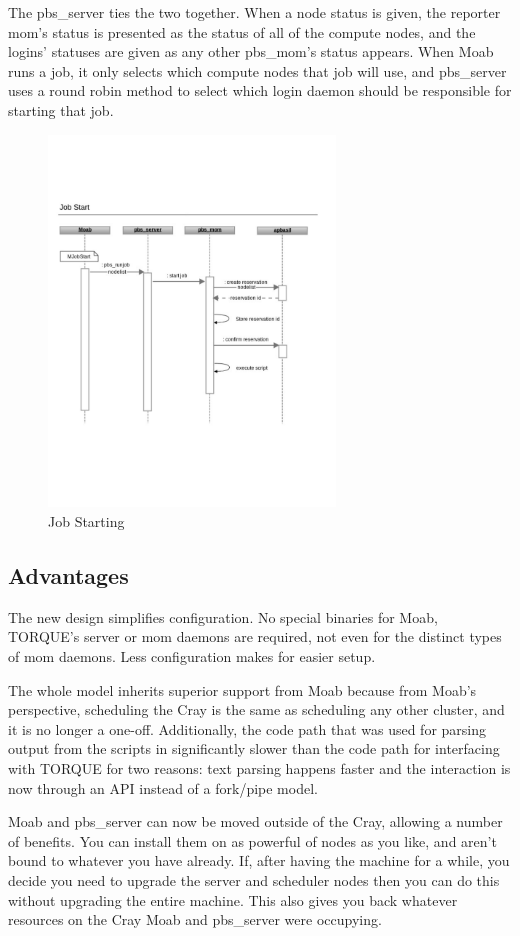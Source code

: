 The pbs_server ties the two together. When a node status is given, the reporter
mom's status is presented as the status of all of the compute nodes, and the
logins' statuses are given as any other pbs_mom's status appears. When Moab
runs a job, it only selects which compute nodes that job will use, and
pbs_server uses a round robin method to select which login daemon should be
responsible for starting that job.

\begin{figure}
  \centering
  \includegraphics[width=3.0in]{figures/job-start.pdf}
  \caption{Job Starting}\label{fig:starting}
\end{figure}

\subsection{Advantages}

The new design simplifies configuration. No special binaries for Moab, TORQUE's
server or mom daemons are required, not even for the distinct types of mom
daemons. Less configuration makes for easier setup.

The whole model inherits superior support from Moab because from Moab's
perspective, scheduling the Cray is the same as scheduling any other cluster,
and it is no longer a one-off. Additionally, the code path that was used for
parsing output from the scripts in significantly slower than the code path for
interfacing with TORQUE for two reasons: text parsing happens faster and the
interaction is now through an API instead of a fork/pipe model.

Moab and pbs_server can now be moved outside of the Cray, allowing a number of
benefits. You can install them on as powerful of nodes as you like, and aren't
bound to whatever you have already.  If, after having the machine for a while,
you decide you need to upgrade the server and scheduler nodes then you can do
this without upgrading the entire machine. This also gives you back whatever
resources on the Cray Moab and pbs_server were occupying.

